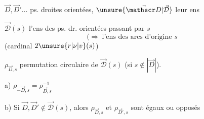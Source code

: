 $\vec D,\vec D'\ldots$ ps. droites orientées, $\unsure{\vec{\mathscr D}|\vec{\mathcal D}}$ leur ens

$\vec{\mathscr D}(s)$ l'ens des ps. dr. orientées passant par $s$
\[
(\Longrightarrow\ \text{l'ens des arcs d'origine }s
\]
(cardinal $2\unsure{r|\nu|v}(s)$)

$\rho_{\vec D,s}$ permutation circulaire de $\vec{\mathscr D}(s)$ (si $s\notin|\vec D|$).

a) $\rho_{-\vec D,s}=\rho_{\vec D,s}^{-1}$

b) Si $\vec D,\vec D'\notin\vec{\mathscr D}(s)$, alors $\rho_{\vec D,s}$ et $\rho_{\vec D',s}$ sont égaux ou
opposés

